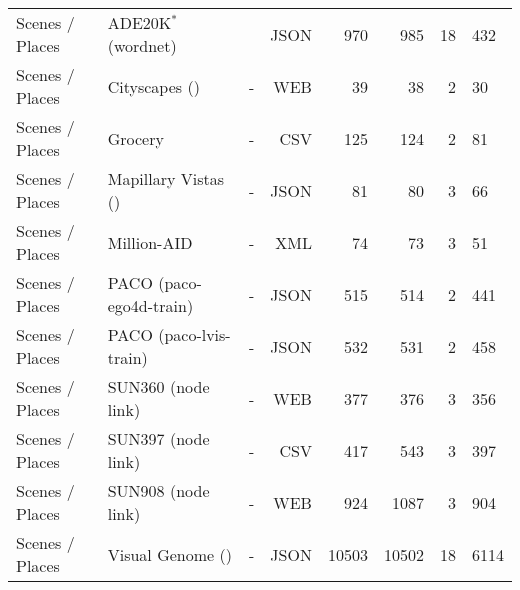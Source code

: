 \begin{table}
\begin{tabular}{lll|rrrr}
Scenes / Places & ADE20K$^*$ (wordnet) & \cite{atigh2022hyperbolic} & JSON & 970 & 985 & 18 & 432 \\
Scenes / Places & Cityscapes () & - & WEB & 39 & 38 & 2 & 30 \\
Scenes / Places & Grocery & - & CSV & 125 & 124 & 2 & 81 \\
Scenes / Places & Mapillary Vistas () & - & JSON & 81 & 80 & 3 & 66 \\
Scenes / Places & Million-AID & - & XML & 74 & 73 & 3 & 51 \\
Scenes / Places & PACO (paco-ego4d-train) & - & JSON & 515 & 514 & 2 & 441 \\
Scenes / Places & PACO (paco-lvis-train) & - & JSON & 532 & 531 & 2 & 458 \\
Scenes / Places & SUN360 (node link) & - & WEB & 377 & 376 & 3 & 356 \\
Scenes / Places & SUN397 (node link) & - & CSV & 417 & 543 & 3 & 397 \\
Scenes / Places & SUN908 (node link) & - & WEB & 924 & 1087 & 3 & 904 \\
Scenes / Places & Visual Genome () & - & JSON & 10503 & 10502 & 18 & 6114 \\
\bottomrule
\end{tabular}
\end{table}
